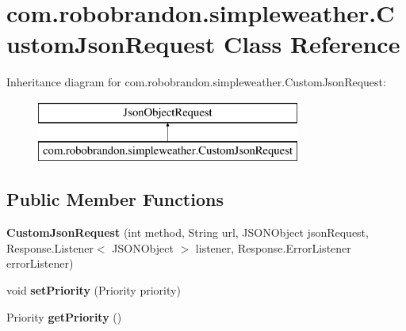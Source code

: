 \hypertarget{classcom_1_1robobrandon_1_1simpleweather_1_1_custom_json_request}{}\section{com.\+robobrandon.\+simpleweather.\+Custom\+Json\+Request Class Reference}
\label{classcom_1_1robobrandon_1_1simpleweather_1_1_custom_json_request}
Inheritance diagram for com.\+robobrandon.\+simpleweather.\+Custom\+Json\+Request\+:\begin{figure}[H]
\begin{center}
\leavevmode
\includegraphics[height=2.000000cm]{classcom_1_1robobrandon_1_1simpleweather_1_1_custom_json_request}
\end{center}
\end{figure}
\subsection*{Public Member Functions}
\begin{DoxyCompactItemize}
\item 
{\bfseries Custom\+Json\+Request} (int method, String url, J\+S\+O\+N\+Object json\+Request, Response.\+Listener$<$ J\+S\+O\+N\+Object $>$ listener, Response.\+Error\+Listener error\+Listener)\hypertarget{classcom_1_1robobrandon_1_1simpleweather_1_1_custom_json_request_a67eb09303e897e4ab90f8ff2388482a6}{}\label{classcom_1_1robobrandon_1_1simpleweather_1_1_custom_json_request_a67eb09303e897e4ab90f8ff2388482a6}

\item 
void {\bfseries set\+Priority} (Priority priority)\hypertarget{classcom_1_1robobrandon_1_1simpleweather_1_1_custom_json_request_a40feb1f46a5a0ce8afdb77c40e8ff0c6}{}\label{classcom_1_1robobrandon_1_1simpleweather_1_1_custom_json_request_a40feb1f46a5a0ce8afdb77c40e8ff0c6}

\item 
Priority {\bfseries get\+Priority} ()\hypertarget{classcom_1_1robobrandon_1_1simpleweather_1_1_custom_json_request_a86527c5df85ea0adca79da6b98b64713}{}\label{classcom_1_1robobrandon_1_1simpleweather_1_1_custom_json_request_a86527c5df85ea0adca79da6b98b64713}

\end{DoxyCompactItemize}
